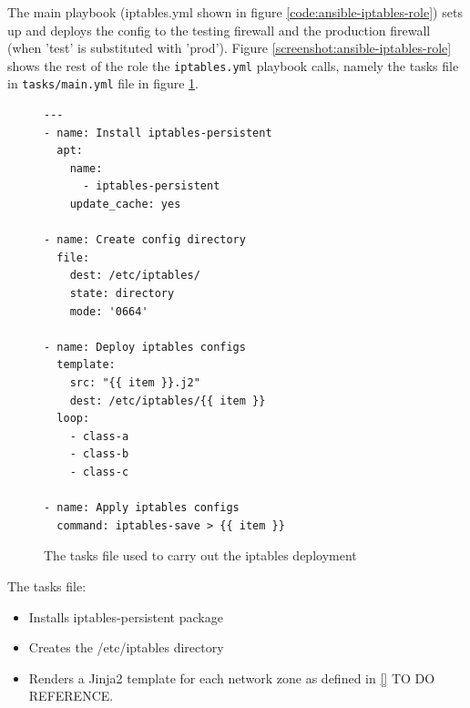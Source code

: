 The main playbook (iptables.yml shown in figure \ref{code:ansible-iptables-role}) sets up and deploys the config to the testing firewall and the production firewall (when 'test' is substituted with 'prod'). Figure \ref{screenshot:ansible-iptables-role} shows the rest of the role the \verb|iptables.yml| playbook calls, namely the tasks file in \verb|tasks/main.yml| file in figure \ref{code:ansible-iptables-tasks}.

\begin{figure}[H]
    \centering
    \begin{verbatim}
---
- name: Install iptables-persistent
  apt:
    name:
      - iptables-persistent
    update_cache: yes

- name: Create config directory
  file:
    dest: /etc/iptables/
    state: directory
    mode: '0664'

- name: Deploy iptables configs
  template:
    src: "{{ item }}.j2"
    dest: /etc/iptables/{{ item }}
  loop:
    - class-a
    - class-b
    - class-c
  
- name: Apply iptables configs
  command: iptables-save > {{ item }}
    \end{verbatim}
    \caption{The tasks file used to carry out the iptables deployment}
    \label{code:ansible-iptables-tasks}
\end{figure}

The tasks file:
\begin{itemize}
    \item Installs iptables-persistent package
    \item Creates the /etc/iptables directory
    \item Renders a Jinja2 template for each network zone as defined in \ref{} TO DO REFERENCE.
\end{itemize}